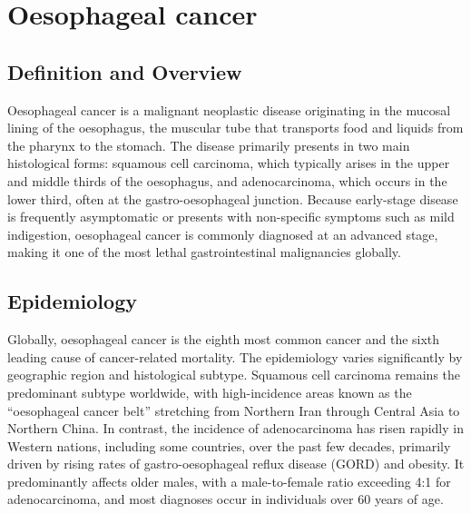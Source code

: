\chapter{Oesophageal cancer}

\section*{Definition and Overview}
Oesophageal cancer is a malignant neoplastic disease originating in the mucosal lining of the oesophagus, the muscular tube that transports food and liquids from the pharynx to the stomach. The disease primarily presents in two main histological forms: squamous cell carcinoma, which typically arises in the upper and middle thirds of the oesophagus, and adenocarcinoma, which occurs in the lower third, often at the gastro-oesophageal junction. Because early-stage disease is frequently asymptomatic or presents with non-specific symptoms such as mild indigestion, oesophageal cancer is commonly diagnosed at an advanced stage, making it one of the most lethal gastrointestinal malignancies globally.

\section*{Epidemiology}
Globally, oesophageal cancer is the eighth most common cancer and the sixth leading cause of cancer-related mortality. The epidemiology varies significantly by geographic region and histological subtype. Squamous cell carcinoma remains the predominant subtype worldwide, with high-incidence areas known as the ``oesophageal cancer belt'' stretching from Northern Iran through Central Asia to Northern China. In contrast, the incidence of adenocarcinoma has risen rapidly in Western nations, including some countries, over the past few decades, primarily driven by rising rates of gastro-oesophageal reflux disease (GORD) and obesity. It predominantly affects older males, with a male-to-female ratio exceeding 4:1 for adenocarcinoma, and most diagnoses occur in individuals over 60 years of age.

